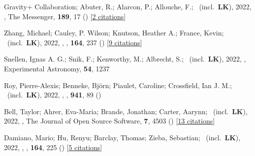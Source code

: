 \item[{\color{numcolor}\scriptsize77}] Gravity+ Collaboration; Abuter, R.; Alarcon, P.; Allouche, F.; \etal\ (incl.\ \textbf{LK}), 2022, , The Messenger, \textbf{189}, 17 () [\href{https://ui.adsabs.harvard.edu/abs/2022Msngr.189...17A}{2 citations}]

\item[{\color{numcolor}\scriptsize76}] Zhang, Michael; Cauley, P. Wilson; Knutson, Heather A.; France, Kevin; \etal\ (incl.\ \textbf{LK}), 2022, , \aj, \textbf{164}, 237 () [\href{https://ui.adsabs.harvard.edu/abs/2022AJ....164..237Z}{9 citations}]

\item[{\color{numcolor}\scriptsize75}] Snellen, Ignas A. G.; Snik, F.; Kenworthy, M.; Albrecht, S.; \etal\ (incl.\ \textbf{LK}), 2022, , Experimental Astronomy, \textbf{54}, 1237

\item[{\color{numcolor}\scriptsize74}] Roy, Pierre-Alexis; Benneke, Bj{\"o}rn; Piaulet, Caroline; Crossfield, Ian J. M.; \etal\ (incl.\ \textbf{LK}), 2022, , \apj, \textbf{941}, 89 ()

\item[{\color{numcolor}\scriptsize73}] Bell, Taylor; Ahrer, Eva-Maria; Brande, Jonathan; Carter, Aarynn; \etal\ (incl.\ \textbf{LK}), 2022, , The Journal of Open Source Software, \textbf{7}, 4503 () [\href{https://ui.adsabs.harvard.edu/abs/2022JOSS....7.4503B}{13 citations}]

\item[{\color{numcolor}\scriptsize72}] Damiano, Mario; Hu, Renyu; Barclay, Thomas; Zieba, Sebastian; \etal\ (incl.\ \textbf{LK}), 2022, , \aj, \textbf{164}, 225 () [\href{https://ui.adsabs.harvard.edu/abs/2022AJ....164..225D}{5 citations}]

